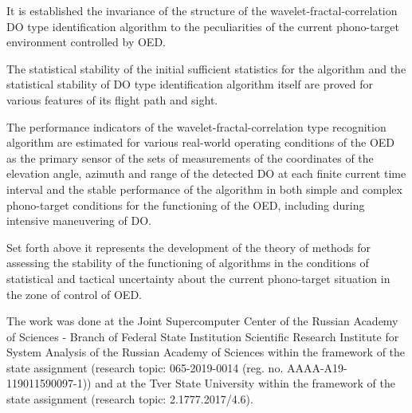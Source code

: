 It is established the invariance of the structure of the wavelet-fractal-correlation DO type identification algorithm to the peculiarities of the current phono-target environment controlled by OED.

The statistical stability of the initial sufficient statistics for the algorithm and the statistical stability of DO type identification algorithm itself are proved for various features of its flight path and sight.

The performance indicators of the wavelet-fractal-correlation type recognition algorithm are estimated for various real-world operating conditions of the OED as the primary sensor of the sets of measurements of the coordinates of the elevation angle, azimuth and range of the detected DO at each finite current time interval and the stable performance of the algorithm in both simple and complex phono-target conditions for the functioning of the OED, including during intensive maneuvering of DO.

Set forth above it represents the development of the theory of methods for assessing the stability of the functioning of algorithms in the conditions of statistical and tactical uncertainty about the current phono-target situation in the zone of control of OED.


\begin{acknowledgements} The work was done at the Joint Supercomputer Center of the Russian Academy of Sciences - Branch of Federal State Institution Scientific Research Institute for System Analysis of the Russian Academy of Sciences within the framework of the state assignment (research topic: 065-2019-0014 (reg. no. AAAA-A19-119011590097-1)) and at the Tver State University within the framework of the state assignment (research topic: 2.1777.2017/4.6).
\end{acknowledgements}